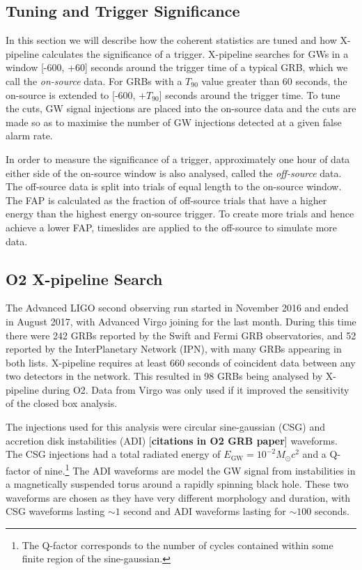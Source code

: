 \documentclass[11pt]{cuthesis}
\newcommand{\xp}{X-pipeline }
\begin{document}
\subsection{Tuning and Trigger Significance}
In this section we will describe how the coherent statistics are tuned and how \xp calculates the significance of a trigger. \xp searches for GWs in a window  [-600, +60] seconds around the trigger time of a typical GRB, which we call the \textit{on-source} data. For GRBs with a $T_{90}$ value greater than 60 seconds, the on-source is extended to [-600, +$T_{90}$] seconds around the trigger time. To tune the cuts, GW signal injections are placed into the on-source data and the cuts are made so as to maximise the number of GW injections detected at a given false alarm rate. 

In order to measure the significance of a trigger, approximately one hour of data either side of the on-source window is also analysed, called the \textit{off-source} data. The off-source data is split into trials of equal length to the on-source window. The FAP is calculated as the fraction of off-source trials that have a higher energy than the highest energy on-source trigger. To create more trials and hence achieve a lower FAP, timeslides are applied to the off-source to simulate more data. 

\subsection{O2 \xp Search} \label{sec:xp o2 results}
The Advanced LIGO second observing run started in November 2016 and ended in August 2017, with Advanced Virgo joining for the last month. During this time there were 242 GRBs reported by the Swift and Fermi GRB observatories, and 52 reported by the InterPlanetary Network (IPN), with many GRBs appearing in both lists. \xp requires at least 660 seconds of coincident data between any two detectors in the network. This resulted in 98 GRBs being analysed by \xp during O2. Data from Virgo was only used if it improved the sensitivity of the closed box analysis. 

The injections used for this analysis were circular sine-gaussian (CSG) and accretion disk instabilities (ADI) [\textbf{citations in O2 GRB paper}] waveforms. The CSG injections had a total radiated energy of $E_\text{GW} = 10^{-2}M_\odot c^2$ and a Q-factor of nine.\footnote{The Q-factor corresponds to the number of cycles contained within some finite region of the sine-gaussian.} The ADI waveforms are model the GW signal from instabilities in a magnetically suspended torus around a rapidly spinning black hole. These two waveforms are chosen as they have very different morphology and duration, with CSG waveforms lasting $\sim1$ second and ADI waveforms lasting for $\sim100$ seconds.
\end{document}
